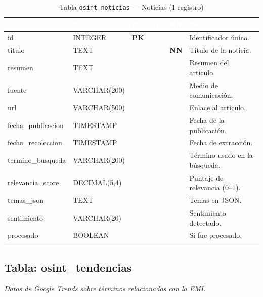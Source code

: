 \documentclass[11pt,a4paper]{article}
\newcommand{\tableheadrow}{\rowcolor{tableheader}}
\newcommand{\tablehead}[1]{\textcolor{white}{\textbf{#1}}}
\newcommand{\pk}{\textcolor{emiblue}{\textbf{PK}}}
\newcommand{\nn}{\textcolor{red!70!black}{\textbf{NN}}}
\begin{document}
\begin{longtable}{p{4.2cm} p{2.8cm} c c c p{4.5cm}}
\toprule
\tableheadrow
\tablehead{Campo} & \tablehead{Tipo} & \tablehead{PK} & \tablehead{FK} & \tablehead{NN} & \tablehead{Descripción} \\
\midrule
\endhead
id & INTEGER & \pk & & & Identificador único. \\
\rowcolor{tablerow}
titulo & TEXT & & & \nn & Título de la noticia. \\
resumen & TEXT & & & & Resumen del artículo. \\
\rowcolor{tablerow}
fuente & VARCHAR(200) & & & & Medio de comunicación. \\
url & VARCHAR(500) & & & & Enlace al artículo. \\
\rowcolor{tablerow}
fecha\_publicacion & TIMESTAMP & & & & Fecha de la publicación. \\
fecha\_recoleccion & TIMESTAMP & & & & Fecha de extracción. \\
\rowcolor{tablerow}
termino\_busqueda & VARCHAR(200) & & & & Término usado en la búsqueda. \\
relevancia\_score & DECIMAL(5,4) & & & & Puntaje de relevancia (0--1). \\
\rowcolor{tablerow}
temas\_json & TEXT & & & & Temas en JSON. \\
sentimiento & VARCHAR(20) & & & & Sentimiento detectado. \\
\rowcolor{tablerow}
procesado & BOOLEAN & & & & Si fue procesado. \\
\bottomrule
\caption{Tabla \texttt{osint\_noticias} — Noticias (1 registro)}
\end{longtable}

\subsection{Tabla: osint\_tendencias}
\textit{Datos de Google Trends sobre términos relacionados con la EMI.}
\end{document}

